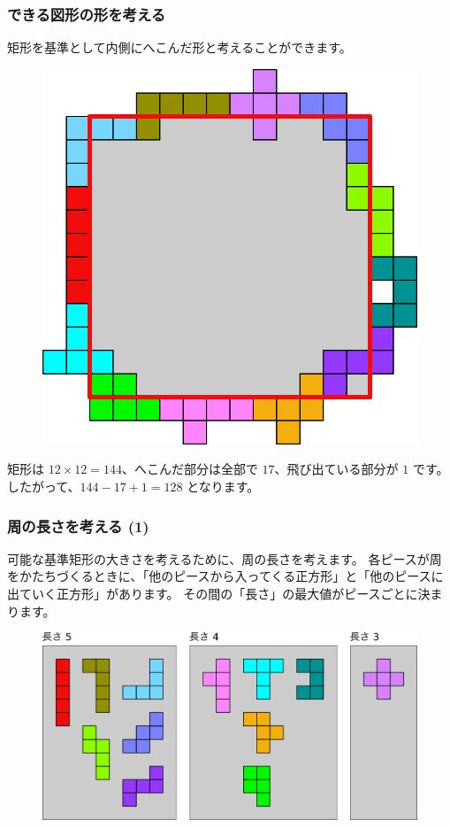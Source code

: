 \documentclass{beamer}
\begin{document}
\begin{frame}
    \frametitle{できる図形の形を考える}

    矩形を基準として内側にへこんだ形と考えることができます。

    \begin{figure}
        \includegraphics[scale=0.2]{images/PentominoFarmMax.png}
    \end{figure}

    矩形は \(12 \times 12 = 144\)、へこんだ部分は全部で \(17\)、飛び出ている部分が \(1\) です。
    したがって、\(144 - 17 + 1 = 128\) となります。
\end{frame}

\begin{frame}
    \frametitle{周の長さを考える (1)}

    可能な基準矩形の大きさを考えるために、周の長さを考えます。
    各ピースが周をかたちづくるときに、「他のピースから入ってくる正方形」と「他のピースに出ていく正方形」があります。
    その間の「長さ」の最大値がピースごとに決まります。

    \begin{figure}
        \includegraphics[scale=0.25]{images/PentominoFarmLength.png}
    \end{figure}
\end{frame}
\end{document}
